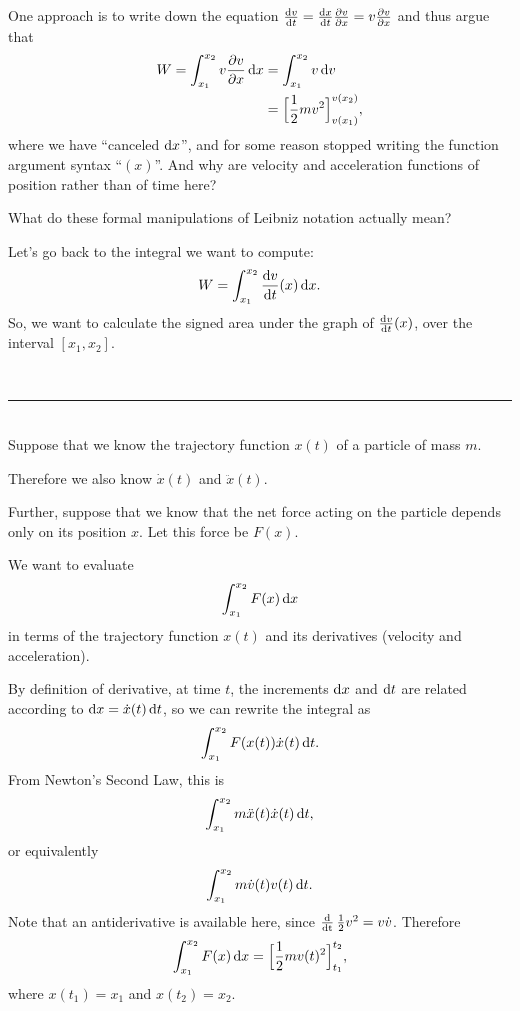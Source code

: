 One approach is to write down the equation $\dvdt = \dxdt \dvdx = v\dvdx$ and thus argue that
\begin{align*}
  W
  = \int_{x_1}^{x_2} v\dvdx \dx
  &= \int_{x_1}^{x_2} v\d v \\
  &= \Big[\frac{1}{2}mv^2\Big]_{v(x_1)}^{v(x_2)},
\end{align*}
where we have ``canceled $\dx$'', and for some reason stopped writing the function argument syntax
``$(x)$''. And why are velocity and acceleration functions of position rather than of time here?

What do these formal manipulations of Leibniz notation actually mean?

Let's go back to the integral we want to compute:
\begin{align*}
  W = \int_{x_1}^{x_2} \dvdt(x) \dx.
\end{align*}
So, we want to calculate the signed area under the graph of $\dvdt(x)$, over the interval
$[x_1, x_2]$.

~\\\hrule~\\

Suppose that we know the trajectory function $x(t)$ of a particle of mass $m$.

Therefore we also know $\dot{x}(t)$ and $\ddot{x}(t)$.

Further, suppose that we know that the net force acting on the particle depends only on its position
$x$. Let this force be $F(x)$.

We want to evaluate
\begin{align*}
  \int_{x_1}^{x_2} F(x) \dx
\end{align*}
in terms of the trajectory function $x(t)$ and its derivatives (velocity and acceleration).

By definition of derivative, at time $t$, the increments $\dx$ and $\dt$ are related according to
$\dx = \dot{x}(t)\dt$, so we can rewrite the integral as
\begin{align*}
  \int_{x_1}^{x_2} F(x(t)) \dot{x}(t)\dt.
\end{align*}
From Newton's Second Law, this is
\begin{align*}
  \int_{x_1}^{x_2} m\ddot{x}(t) \dot{x}(t)\dt,
\end{align*}
or equivalently
\begin{align*}
  \int_{x_1}^{x_2} m\dot{v}(t) v(t)\dt.
\end{align*}
Note that an antiderivative is available here, since $\operatorname{\frac{\text{d}}{\text{dt}}} \frac{1}{2}v^2 = v\dot{v}$. Therefore
\begin{align*}
  \int_{x_1}^{x_2} F(x) \dx = \Big[\frac{1}{2}mv(t)^2\Big]_{t_1}^{t_2},
\end{align*}
where $x(t_1) = x_1$ and $x(t_2) = x_2$. 



